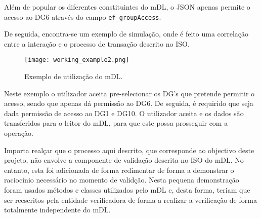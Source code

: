 Além de popular os diferentes constituintes do mDL, o JSON apenas permite o acesso ao DG6 através do campo \texttt{ef\_groupAccess}.

De seguida, encontra-se um exemplo de simulação, onde é feito uma correlação entre a interação e o processo de transação descrito no ISO.

\begin{figure}[H]
    \centering
    \texttt{[image: working\_example2.png]}
    \caption{Exemplo de utilização do mDL.}
	\label{fig:working_example2}
\end{figure}

Neste exemplo o utilizador aceita pre-selecionar os DG's que pretende permitir o acesso, sendo que apenas dá permissão ao DG6. De seguida, é requirido que seja dada permissão de acesso ao DG1 e DG10. O utilizador aceita e os dados são transferidos para o leitor do mDL, para que este possa prosseguir com a operação.

Importa realçar que o processo aqui descrito, que corresponde ao objectivo deste projeto, não envolve a componente de validação descrita no ISO do mDL\@. No entanto, esta foi adicionada de forma redimentar de forma a demonstrar o raciocínio necessário no momento de validção. Nesta pequena demonstração foram usados métodos e classes utilizados pelo mDL e, desta forma, teriam que ser reescritos pela entidade verificadora de forma a realizar a verificação de forma totalmente independente do mDL.
